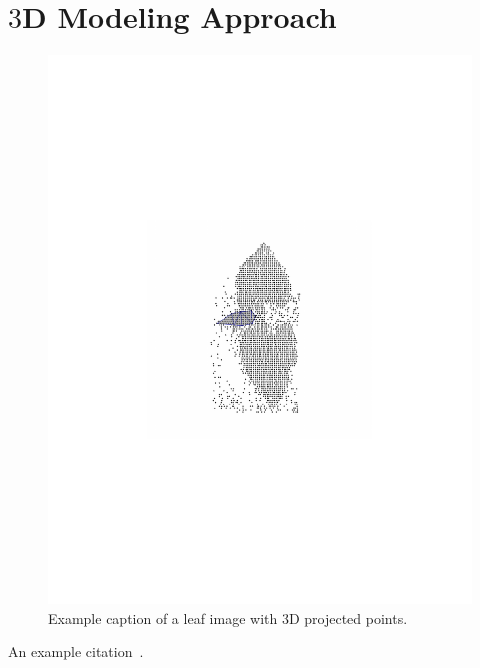 \section{$3$D Modeling Approach}
\label{sec:data}

\begin{figure}
\begin{center}
   \includegraphics[trim=200 250 200 270,clip,width=0.9\linewidth]{Figures/sampleLeaf}
\end{center}
   \caption{Example caption of a leaf image with $3$D projected points.}
\label{fig:long}
\label{fig:onecol}
\end{figure}

An example citation~\cite{Zhang2000}.

